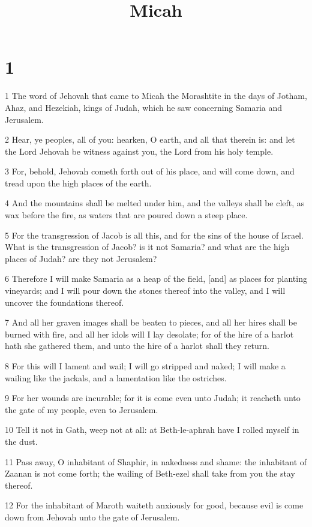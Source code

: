 

\title{Micah}

\chapter{1}

\par 1 The word of Jehovah that came to Micah the Morashtite in the days of Jotham, Ahaz, and Hezekiah, kings of Judah, which he saw concerning Samaria and Jerusalem.
\par 2 Hear, ye peoples, all of you: hearken, O earth, and all that therein is: and let the Lord Jehovah be witness against you, the Lord from his holy temple.
\par 3 For, behold, Jehovah cometh forth out of his place, and will come down, and tread upon the high places of the earth.
\par 4 And the mountains shall be melted under him, and the valleys shall be cleft, as wax before the fire, as waters that are poured down a steep place.
\par 5 For the transgression of Jacob is all this, and for the sins of the house of Israel. What is the transgression of Jacob? is it not Samaria? and what are the high places of Judah? are they not Jerusalem?
\par 6 Therefore I will make Samaria as a heap of the field, [and] as places for planting vineyards; and I will pour down the stones thereof into the valley, and I will uncover the foundations thereof.
\par 7 And all her graven images shall be beaten to pieces, and all her hires shall be burned with fire, and all her idols will I lay desolate; for of the hire of a harlot hath she gathered them, and unto the hire of a harlot shall they return.
\par 8 For this will I lament and wail; I will go stripped and naked; I will make a wailing like the jackals, and a lamentation like the ostriches.
\par 9 For her wounds are incurable; for it is come even unto Judah; it reacheth unto the gate of my people, even to Jerusalem.
\par 10 Tell it not in Gath, weep not at all: at Beth-le-aphrah have I rolled myself in the dust.
\par 11 Pass away, O inhabitant of Shaphir, in nakedness and shame: the inhabitant of Zaanan is not come forth; the wailing of Beth-ezel shall take from you the stay thereof.
\par 12 For the inhabitant of Maroth waiteth anxiously for good, because evil is come down from Jehovah unto the gate of Jerusalem.
